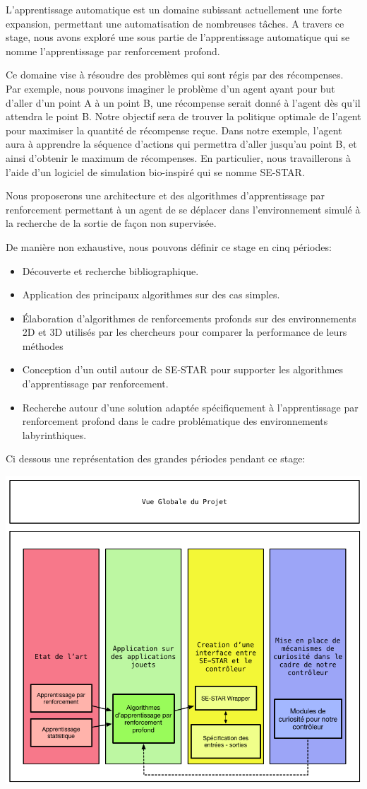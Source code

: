 L'apprentissage automatique est un domaine subissant actuellement une forte expansion, permettant une automatisation de nombreuses tâches. A travers ce stage, nous avons exploré une sous partie de l'apprentissage automatique qui se nomme l'apprentissage par renforcement profond. 

Ce domaine vise à résoudre des problèmes qui sont régis par des récompenses. Par exemple, nous pouvons imaginer le problème d'un agent ayant pour but d'aller d'un point A à un point B, une récompense serait donné à l'agent dès qu'il attendra le point B. Notre objectif sera de trouver la politique optimale de l'agent pour maximiser la quantité de récompense reçue. Dans notre exemple, l'agent aura à apprendre la séquence d'actions qui permettra d'aller jusqu'au point B, et ainsi d'obtenir le maximum de récompenses. En particulier, nous travaillerons à l'aide d'un logiciel de simulation bio-inspiré qui se nomme SE-STAR. 

Nous proposerons une architecture et des algorithmes d'apprentissage par renforcement permettant à un agent de se déplacer dans l'environnement simulé à la recherche de la sortie de façon non supervisée. 

De manière non exhaustive, nous pouvons définir ce stage en cinq périodes: 
\begin{itemize}
    \item Découverte et recherche bibliographique.
    \item Application des principaux algorithmes sur des cas simples.
    \item Élaboration d'algorithmes de renforcements profonds sur des environnements 2D et 3D utilisés par les chercheurs pour comparer la performance de leurs méthodes
    \item Conception d'un outil autour de SE-STAR pour supporter les algorithmes d'apprentissage par renforcement.
    \item Recherche autour d'une solution adaptée spécifiquement à l'apprentissage par renforcement profond dans le cadre problématique des environnements labyrinthiques.
\end{itemize}

Ci dessous une représentation des grandes périodes pendant ce stage:

\begin{center}
\includegraphics[scale=.5]{./assets/globale.png}
\end{center}
